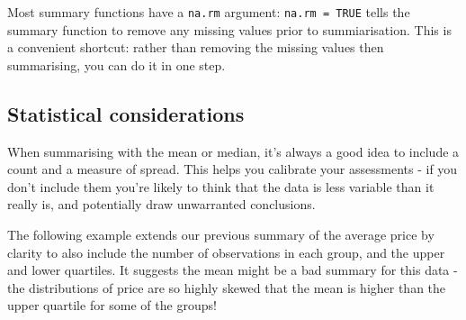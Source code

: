 Most summary functions have a \texttt{na.rm} argument:
\texttt{na.rm\ =\ TRUE} tells the summary function to remove any missing
values prior to summiarisation. This is a convenient shortcut: rather
than removing the missing values then summarising, you can do it in one
step.

\subsection{Statistical
considerations}\label{statistical-considerations}

When summarising with the mean or median, it's always a good idea to
include a count and a measure of spread. This helps you calibrate your
assessments - if you don't include them you're likely to think that the
data is less variable than it really is, and potentially draw
unwarranted conclusions.

The following example extends our previous summary of the average price
by clarity to also include the number of observations in each group, and
the upper and lower quartiles. It suggests the mean might be a bad
summary for this data - the distributions of price are so highly skewed
that the mean is higher than the upper quartile for some of the groups!

\begin{Shaded}
\end{Shaded}

